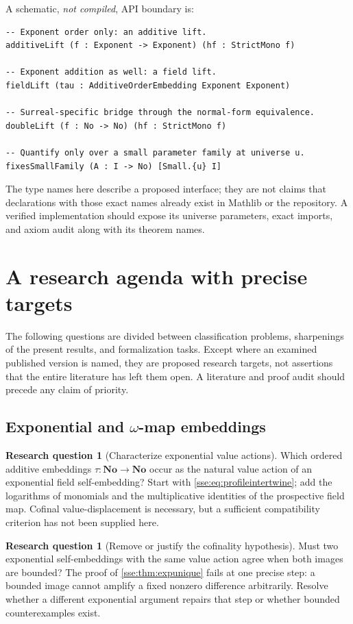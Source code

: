 \documentclass[11pt,a4paper]{article}
\numberwithin{equation}{section}
\theoremstyle{plain}
\theoremstyle{definition}
\newtheorem{question}[theorem]{Research question}
\theoremstyle{remark}
\newcommand{\No}{\mathbf{No}}
\begin{document}
A schematic, \emph{not compiled}, API boundary is:
\begin{verbatim}
-- Exponent order only: an additive lift.
additiveLift (f : Exponent -> Exponent) (hf : StrictMono f)

-- Exponent addition as well: a field lift.
fieldLift (tau : AdditiveOrderEmbedding Exponent Exponent)

-- Surreal-specific bridge through the normal-form equivalence.
doubleLift (f : No -> No) (hf : StrictMono f)

-- Quantify only over a small parameter family at universe u.
fixesSmallFamily (A : I -> No) [Small.{u} I]
\end{verbatim}
The type names here describe a proposed interface; they are not claims
that declarations with those exact names already exist in Mathlib or the
repository. A verified implementation should expose its universe
parameters, exact imports, and axiom audit along with its theorem names.

\section{A research agenda with precise targets}\label{sse:sec:agenda}

The following questions are divided between classification problems,
sharpenings of the present results, and formalization tasks. Except where
an examined published version is named, they are proposed research targets,
not assertions that the entire literature has left them open. A literature
and proof audit should precede any claim of priority.

\subsection{Exponential and \texorpdfstring{$\omega$}{omega}-map embeddings}
\begin{question}[Characterize exponential value actions]
Which ordered additive embeddings $\tau:\No\to\No$ occur as the natural
value action of an exponential field self-embedding? Start with
\eqref{sse:eq:profileintertwine}; add the logarithms of monomials and the
multiplicative identities of the prospective field map. Cofinal
value-displacement is necessary, but a sufficient compatibility criterion
has not been supplied here.
\end{question}

\begin{question}[Remove or justify the cofinality hypothesis]
Must two exponential self-embeddings with the same value action agree
when both images are bounded? The proof of \cref{sse:thm:expunique} fails at
one precise step: a bounded image cannot amplify a fixed nonzero difference
arbitrarily. Resolve whether a different exponential argument repairs that
step or whether bounded counterexamples exist.
\end{question}
\end{document}

